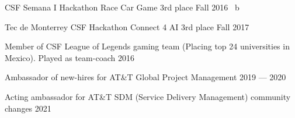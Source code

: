 CSF Semana I Hackathon Race Car Game 3rd place	\hfill Fall 2016 \ b

Tec de Monterrey CSF Hackathon Connect 4 AI 3rd place	\hfill Fall 2017

Member of CSF League of Legends gaming team (Placing top 24 universities in Mexico). Played as team-coach	\hfill 2016

Ambassador of new-hires for AT&T Global Project Management \hfill 2019 --- 2020

Acting ambassador for AT&T SDM (Service Delivery Management) community changes \hfill 2021